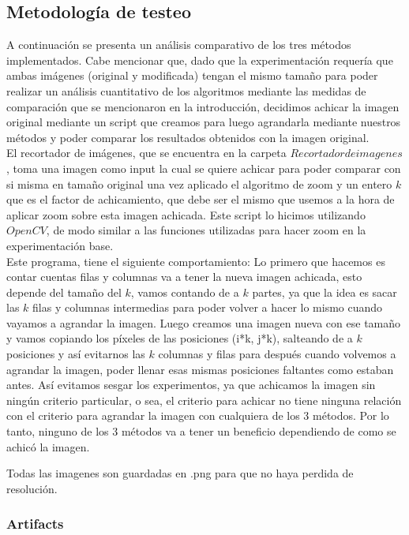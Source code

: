 \subsection{Metodología de testeo}
A continuación se presenta un análisis comparativo de los tres métodos implementados.
Cabe mencionar que, dado que la experimentación requería que ambas imágenes (original y modificada) tengan el mismo tamaño para poder realizar un análisis cuantitativo de los algoritmos mediante las medidas de comparación que se mencionaron en la introducción, decidimos achicar la imagen original mediante un script que creamos para luego agrandarla mediante nuestros métodos y poder comparar los resultados obtenidos con la imagen original.
\\
El recortador de imágenes, que se encuentra en la carpeta $Recortador de imagenes$, toma una imagen como input la cual se quiere achicar para poder comparar con si misma en tamaño original una vez aplicado el algoritmo de zoom y un entero $k$ que es el factor de achicamiento, que debe ser el mismo que usemos a la hora de aplicar zoom sobre esta imagen achicada. Este script lo hicimos utilizando $OpenCV$, de modo similar a las funciones utilizadas para hacer zoom en la experimentación base.
\\ 
Este programa, tiene el siguiente comportamiento:
Lo primero que hacemos es contar cuentas filas y columnas va a tener la nueva imagen achicada, esto depende del tamaño del $k$, vamos contando de a $k$ partes, ya que la idea es sacar las $k$ filas y columnas intermedias para poder volver a hacer lo mismo cuando vayamos a agrandar la imagen. Luego creamos una imagen nueva con ese tamaño y vamos copiando los píxeles de las posiciones (i*k, j*k), salteando de a $k$ posiciones y así evitarnos las $k$ columnas y filas para después cuando volvemos a agrandar la imagen, poder llenar esas mismas posiciones faltantes como estaban antes. Así evitamos sesgar los experimentos, ya que achicamos la imagen sin ningún criterio particular, o sea, el criterio para achicar no tiene ninguna relación con el criterio para agrandar la imagen con cualquiera de los 3 métodos. Por lo tanto, ninguno de los 3 métodos va a tener un beneficio dependiendo de como se achicó la imagen.   

Todas las imagenes son guardadas en .png para que no haya perdida de resolución.

\subsubsection{Artifacts}

